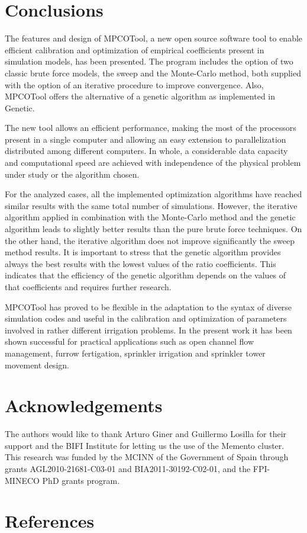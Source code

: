 \documentclass[review,authoryear]{elsarticle}
\begin{document}
\section{Conclusions}

The features and design of MPCOTool, a new open source software tool to enable efficient calibration and optimization of empirical coefficients present in simulation models, has been presented. The program includes the option of two classic brute force models, the sweep and the Monte-Carlo method, both supplied with the option of an iterative procedure to improve convergence. Also, MPCOTool offers the alternative of a genetic algorithm as implemented in Genetic.

The new tool allows an efficient performance, making the most of the processors present in a single computer and allowing an easy extension to parallelization distributed among different computers. In whole, a considerable data capacity and computational speed are achieved with independence of the physical problem under study or the algorithm chosen.

For the analyzed cases, all the implemented optimization algorithms have reached similar results with the same total number of simulations. However, the iterative algorithm applied in combination with the Monte-Carlo method and the genetic algorithm leads to slightly better results than the pure brute force techniques. On the other hand, the iterative algorithm does not improve significantly the sweep method results. It is important to stress that the genetic algorithm provides always the best results with the lowest values of the ratio coefficients. This indicates that the efficiency of the genetic algorithm depends on the values of that coefficients and requires further research. 

MPCOTool has proved to be flexible in the adaptation to the syntax of diverse simulation codes and useful in the calibration and optimization of parameters involved in rather different irrigation problems. In the present work it has been shown successful for practical applications such as open channel flow management, furrow fertigation, sprinkler irrigation and sprinkler tower movement design.

\section*{Acknowledgements}

The authors would like to thank Arturo Giner and Guillermo Losilla for their support and the BIFI
Institute for letting us the use of the Memento cluster.
This research was funded by the MCINN of the Government of Spain through grants AGL2010-21681-C03-01 and BIA2011-30192-C02-01, and the FPI-MINECO PhD grants program.

\section*{References}

\end{document}
